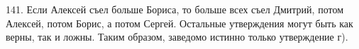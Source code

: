 141. Если Алексей съел больше Бориса, то больше всех съел Дмитрий, потом Алексей, потом Борис, а потом Сергей. Остальные утверждения могут быть как верны, так и ложны. Таким образом, заведомо истинно только утверждение г).\\

